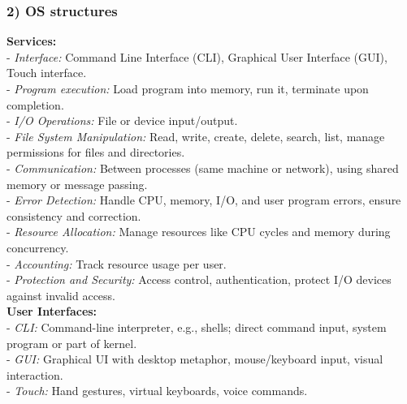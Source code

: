 \subsubsection*{2) OS structures}

\textbf{Services:}\\
- \textit{Interface:} Command Line Interface (CLI), Graphical User Interface (GUI), Touch interface.\\
- \textit{Program execution:} Load program into memory, run it, terminate upon completion.\\
- \textit{I/O Operations:} File or device input/output.\\
- \textit{File System Manipulation:} Read, write, create, delete, search, list, manage permissions for files and directories.\\
- \textit{Communication:} Between processes (same machine or network), using shared memory or message passing.\\
- \textit{Error Detection:} Handle CPU, memory, I/O, and user program errors, ensure consistency and correction.\\
- \textit{Resource Allocation:} Manage resources like CPU cycles and memory during concurrency.\\
- \textit{Accounting:} Track resource usage per user. \\
- \textit{Protection and Security:} Access control, authentication, protect I/O devices against invalid access.\\

\textbf{User Interfaces:} \\
- \textit{CLI:} Command-line interpreter, e.g., shells; direct command input, system program or part of kernel. \\
- \textit{GUI:} Graphical UI with desktop metaphor, mouse/keyboard input, visual interaction. \\
- \textit{Touch:} Hand gestures, virtual keyboards, voice commands. \\

